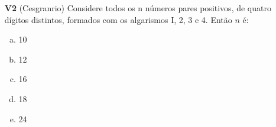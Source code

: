 \documentclass[a4paper,12pt]{article}
\begin{document}
\begin{enumerate}
\item[\textbf{V2}] (Cesgranrio) Considere todos os n números pares positivos, de quatro dígitos distintos, formados com os algarismos I, 2, 3 e 4. Então $n$ é:
  \begin{enumerate}[a)]
    \item 10
    \item 12
    \item 16
    \item 18
    \item 24 
  \end{enumerate} 

\end{enumerate}


%
%
%    
%    
%    
\end{document}
